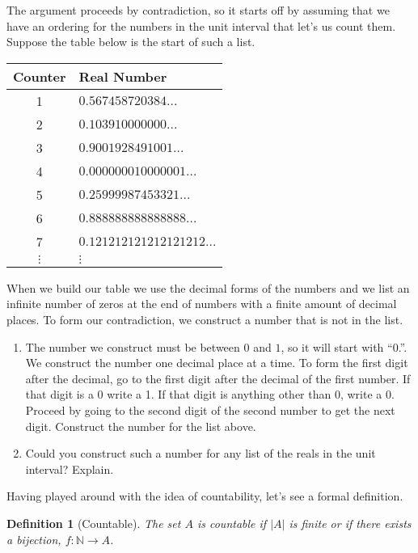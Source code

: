 \documentclass[12 pt]{article}
\newcommand{\N}{\mathbb{N}}
\theoremstyle{definition}
\theoremstyle{plain}
\theoremstyle{mytheorem}
\theoremstyle{myexample}
\theoremstyle{mydefinition}
\newtheorem{definition}{Definition}
\begin{document}
The argument proceeds by contradiction, so it starts off by assuming that we have an ordering for the numbers in the unit interval that let's us count them.  Suppose the table below is the start of such a list.
	\begin{center}
	\begin{tabular}{c|l}
	Counter & Real Number \\
	\hline
	1 & $0.567458720384\ldots$\\
	2 & $0.103910000000\ldots$\\
	3 & $0.9001928491001\ldots$\\
	4 & $0.000000010000001\ldots$\\
	5 & $0.25999987453321\ldots$\\
	6 & $0.888888888888888\ldots$\\
	7 & $0.121212121212121212\ldots$\\
	$\vdots$ & $\vdots$
	\end{tabular}
	\end{center}
When we build our table we use the decimal forms of the numbers and we list an infinite number of zeros at the end of numbers with a finite amount of decimal places.  To form our contradiction, we construct a number that is not in the list.
\begin{enumerate}[resume]
\item The number we construct must be between $0$ and $1$, so it will start with ``0.''.  We construct the number one decimal place at a time.  To form the first digit after the decimal, go to the first digit after the decimal of the first number.  If that digit is a 0 write a 1.  If that digit is anything other than 0, write a 0.  Proceed by going to the second digit of the second number to get the next digit.  Construct the number for the list above.
\vspace{2in}
\item Could you construct such a number for any list of the reals in the unit interval?  Explain.

\vspace{2in}
\end{enumerate}

Having played around with the idea of countability, let's see a formal definition.

\begin{definition}[Countable]  The set $A$ is \textit{countable} if $|A|$ is finite or if there exists a bijection, $f:\N \to A$.
\end{definition}
\end{document}
